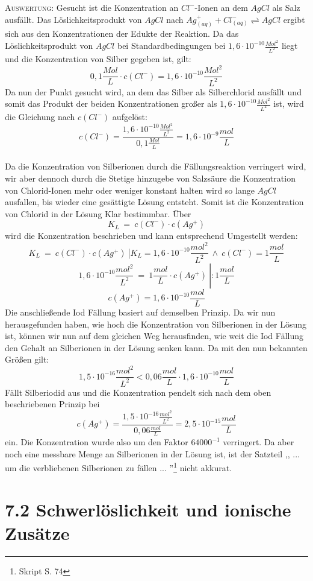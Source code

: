 \documentclass[11pt, a4paper]{article}
\begin{document}
\textsc{Auswertung:}\hspace{8mm} Gesucht ist die Konzentration an $Cl^-$-Ionen an dem $AgCl$ als Salz ausfällt. Das Löslichkeitsprodukt von $AgCl$ nach $Ag^+_{(aq)} + Cl^-_{(aq)} \rightleftharpoons AgCl$ ergibt sich aus den Konzentrationen der Edukte der Reaktion. Da das Löslichkeitsprodukt von $AgCl$  bei Standardbedingungen bei $1,6\cdot 10^{-10}\frac{Mol^2}{L^2}$ liegt und die Konzentration von Silber gegeben ist, gilt: $$0,1\frac{Mol}{L}\cdot c(Cl^-) = 1,6\cdot 10^{-10}\frac{Mol^2}{L^2}$$ Da nun der Punkt gesucht wird, an dem das Silber als Silberchlorid ausfällt und somit das Produkt der beiden Konzentrationen großer als $1,6\cdot 10^{-10}\frac{Mol^2}{L^2}$ ist, wird die Gleichung nach $c(Cl^-)$ aufgelöst: $$c(Cl^-)=\frac{1,6\cdot 10^{-10}\frac{Mol^2}{L^2}}{0,1\frac{Mol}{L}}=1,6\cdot 10^{-9}\frac{mol}{L}$$\\
Da die Konzentration von Silberionen durch die Fällungsreaktion verringert wird, wir aber dennoch durch die Stetige hinzugebe von Salzsäure die Konzentration von Chlorid-Ionen mehr oder weniger konstant halten wird so lange $AgCl$ ausfallen, bis wieder eine gesättigte Lösung entsteht. Somit ist die Konzentration von Chlorid in der Lösung Klar bestimmbar. Über $$K_L\ =\ c(Cl^-)\cdot c(Ag^+)$$ wird die Konzentration beschrieben und kann entsprechend Umgestellt werden: $$\left. K_L\ =\ c(Cl^-)\cdot c(Ag^+)\ \right| K_L=1,6\cdot 10^{-10}\frac{mol^2}{L^2}\ \wedge\ c(Cl^-)=1\frac{mol}{L}$$ $$\left. 1,6\cdot 10^{-10}\frac{mol^2}{L^2}\ =\ 1\frac{mol}{L} \cdot c(Ag^+)\ \right| :1\frac{mol}{L}$$ $$c(Ag^+)=1,6\cdot 10^{-10}\frac{mol}{L}$$ Die anschließende Iod Fällung basiert auf demselben Prinzip. Da wir nun herausgefunden haben, wie hoch die Konzentration von Silberionen in der Lösung ist, können wir nun auf dem gleichen Weg herausfinden, wie weit die Iod Fällung den Gehalt an Silberionen in der Lösung senken kann. Da mit den nun bekannten Größen gilt: $$1,5\cdot 10^{-16}\frac{mol^2}{L^2} < 0,06\frac{mol}{L}\cdot 1,6\cdot 10^{-10}\frac{mol}{L}$$
Fällt Silberiodid aus und die Konzentration pendelt sich nach dem oben beschriebenen Prinzip bei $$c(Ag^+) = \frac{1,5\cdot 10^{-16}\frac{mol^2}{L^2}}{0,06\frac{mol}{L}}=2,5\cdot 10^{-15}\frac{mol}{L}$$ ein. Die Konzentration wurde also um den Faktor $64000^{-1}$ verringert. Da aber noch eine messbare Menge an Silberionen in der Lösung ist, ist der Satzteil ,, ... um die verbliebenen Silberionen zu fällen ... ''\footnote{Skript S. 74} nicht akkurat.

\newpage
\section{7.2 Schwerlöslichkeit und ionische Zusätze}
\end{document}
